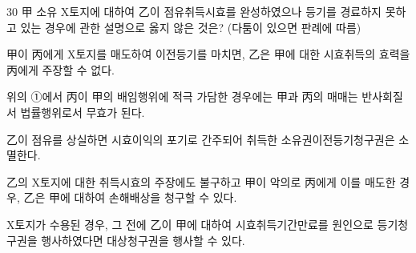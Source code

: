 \begin{question}{30}
甲 소유 X토지에 대하여 乙이 점유취득시효를 완성하였으나 등기를 경료하지 못하고 있는 경우에 관한 설명으로 옳지 않은 것은? (다툼이 있으면 판례에 따름)
\begin{choices}
  \item 甲이 丙에게 X토지를 매도하여 이전등기를 마치면, 乙은 甲에 대한 시효취득의 효력을 丙에게 주장할 수 없다.
  \item 위의 ①에서 丙이 甲의 배임행위에 적극 가담한 경우에는 甲과 丙의 매매는 반사회질서 법률행위로서 무효가 된다.
  \item 乙이 점유를 상실하면 시효이익의 포기로 간주되어 취득한 소유권이전등기청구권은 소멸한다.
  \item 乙의 X토지에 대한 취득시효의 주장에도 불구하고 甲이 악의로 丙에게 이를 매도한 경우, 乙은 甲에 대하여 손해배상을 청구할 수 있다.
  \item X토지가 수용된 경우, 그 전에 乙이 甲에 대하여 시효취득기간만료를 원인으로 등기청구권을 행사하였다면 대상청구권을 행사할 수 있다.
\end{choices}
\end{question}
